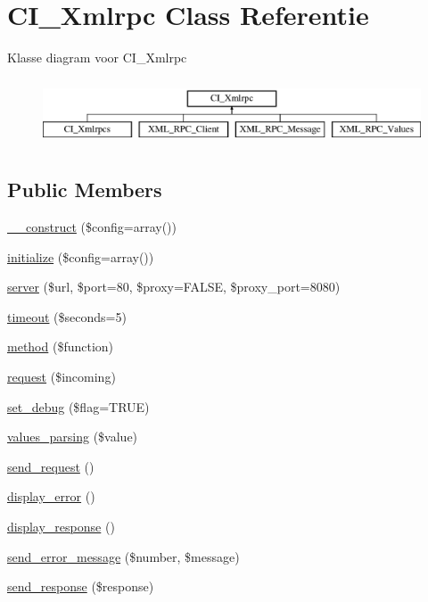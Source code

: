 \hypertarget{class_c_i___xmlrpc}{}\section{C\+I\+\_\+\+Xmlrpc Class Referentie}
\label{class_c_i___xmlrpc}
Klasse diagram voor C\+I\+\_\+\+Xmlrpc\begin{figure}[H]
\begin{center}
\leavevmode
\includegraphics[height=2.000000cm]{class_c_i___xmlrpc}
\end{center}
\end{figure}
\subsection*{Public Members}
\begin{DoxyCompactItemize}
\item 
\mbox{\hyperlink{class_c_i___xmlrpc_af7f9493844d2d66e924e3c1df51ce616}{\+\_\+\+\_\+construct}} (\$config=array())
\item 
\mbox{\hyperlink{class_c_i___xmlrpc_a481385e36d920f5a5005ace05c6cd016}{initialize}} (\$config=array())
\item 
\mbox{\hyperlink{class_c_i___xmlrpc_a9969815a7195f6915eb73afcab3f9e9e}{server}} (\$url, \$port=80, \$proxy=F\+A\+L\+SE, \$proxy\+\_\+port=8080)
\item 
\mbox{\hyperlink{class_c_i___xmlrpc_ada3149e6290a7991c7dfc88c6c90f2db}{timeout}} (\$seconds=5)
\item 
\mbox{\hyperlink{class_c_i___xmlrpc_a3d7e090549ec52eba8cf65598eefa72c}{method}} (\$function)
\item 
\mbox{\hyperlink{class_c_i___xmlrpc_a10d4ec842c61f2301ecccc900500e4c8}{request}} (\$incoming)
\item 
\mbox{\hyperlink{class_c_i___xmlrpc_a277e289843ab2ff13a12441e1dd5cd37}{set\+\_\+debug}} (\$flag=T\+R\+UE)
\item 
\mbox{\hyperlink{class_c_i___xmlrpc_ae22fc267af5ff6330cb47172c78cc2c8}{values\+\_\+parsing}} (\$value)
\item 
\mbox{\hyperlink{class_c_i___xmlrpc_ad6f2431aec35ca073f3bdac3f0e8c66a}{send\+\_\+request}} ()
\item 
\mbox{\hyperlink{class_c_i___xmlrpc_adf0d809d39e17bc0e08387436db31386}{display\+\_\+error}} ()
\item 
\mbox{\hyperlink{class_c_i___xmlrpc_a3a8aedc2a1e6a67ad248dc6078ce8614}{display\+\_\+response}} ()
\item 
\mbox{\hyperlink{class_c_i___xmlrpc_a024ae8a44e09995c6d0b6cb50d8abd9a}{send\+\_\+error\+\_\+message}} (\$number, \$message)
\item 
\mbox{\hyperlink{class_c_i___xmlrpc_ac567feb54a4bda4cad24ff63d09267a1}{send\+\_\+response}} (\$response)
\end{DoxyCompactItemize}
